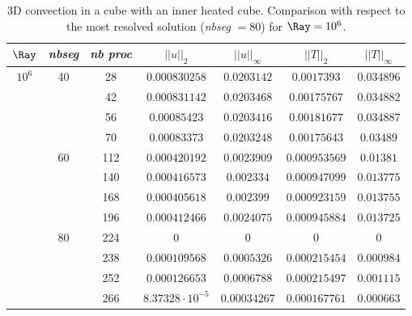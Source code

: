 \begin{table}
\begin{center}
\begin{tabular}{|*{7}{c|}}

		\hline
                $\Ray$ & \em{nbseg} & \em{nb proc }                    & $||u||_{2}$                        & $||u||_{\infty}$                & $||T||_{2}$              & $||T||_{\infty}$\\ \hline \bottomrule
                \multirow{12}{*}{$10^6$}& \multirow{4}{*}{40} & 28 & $0.000830258$ & $0.0203142$ & $ 0.0017393 $ & $0.034896$ \\ \cline{3-7}
                & & 42 & $0.000831142$ & $0.0203468$ & $ 0.00175767 $ & $0.034882$ \\ \cline{3-7}
                & & 56 & $0.00085423$ & $0.0203416$ & $ 0.00181677 $ & $0.034887$ \\ \cline{3-7}
                & & 70 & $0.00083373$ & $0.0203248$ & $ 0.00175643 $ & $0.03489$ \\ \cline{2-7}
                & \multirow{4}{*}{60} & 112 & $0.000420192$ & $0.0023909$ & $ 0.000953569 $ & $0.01381$ \\ \cline{3-7}
                & & 140 & $0.000416573$ & $0.002334$ & $ 0.000947099 $ & $0.013775$ \\ \cline{3-7}
                & & 168 & $0.000405618$ & $0.002399$ & $ 0.000923159 $ & $0.013755$ \\ \cline{3-7}
                & & 196 & $0.000412466$ & $0.0024075$ & $ 0.000945884 $ & $0.013725$ \\ \cline{2-7}
                & \multirow{4}{*}{80} & 224 & $0$ & $0$ & $ 0 $ & $0$ \\ \cline{3-7}
                & & 238 & $0.000109568$ & $0.0005326$ & $ 0.000215454 $ & $0.000984$ \\ \cline{3-7}
                & & 252 & $0.000126653$ & $0.0006788$ & $ 0.000215497 $ & $0.001115$ \\ \cline{3-7}
                & & 266 & $8.37328\cdot10^{-5}$ & $0.00034267$ & $ 0.000167761 $ & $0.000663$ \\  \toprule
      
\end{tabular}
\end{center}
\caption {3D convection in a cube with an inner heated cube. Comparison with respect to the most resolved solution ({\em nbseg} $= 80$) for $\Ray = 10^6$.}
\label{tab-T2}
\end{table}




